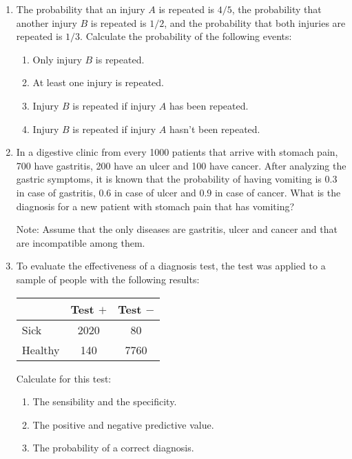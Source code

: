 \begin{enumerate}[leftmargin=*,resume]
\item The probability that an injury $A$ is repeated is $4/5$, the probability that another injury $B$ is repeated is
$1/2$, and the probability that both injuries are repeated is $1/3$.
Calculate the probability of the following events:
\begin{enumerate}
\item Only injury $B$ is repeated.
\item At least one injury is repeated.
\item Injury $B$ is repeated if injury $A$ has been repeated.
\item Injury $B$ is repeated if injury $A$ hasn't been repeated. 
\end{enumerate}

\item In a digestive clinic from every 1000 patients that arrive with stomach pain, 700 have gastritis,
200 have an ulcer and 100 have cancer.
After analyzing the gastric symptoms, it is known that the probability of having vomiting is $0.3$ in case of gastritis,
$0.6$ in case of ulcer and $0.9$ in case of cancer. 
What is the diagnosis for a new patient with stomach pain that has vomiting?

Note: Assume that the only diseases are gastritis, ulcer and cancer and that are incompatible among them.  

\item To evaluate the effectiveness of a diagnosis test, the test was applied to a sample of people with the
following results:

\begin{center}
\begin{tabular}{|l|c|c|}
\cline{2-3}
\multicolumn{1}{l|}{} & Test $+$ & Test $-$ \\
\hline
Sick & 2020 & 80 \\
\hline
Healthy & 140 & 7760 \\
\hline
\end{tabular}
\end{center}

Calculate for this test:
\begin{enumerate}
\item The sensibility and the specificity.
\item The positive and negative predictive value.
\item The probability of a correct diagnosis. 
\end{enumerate}


\end{enumerate}
